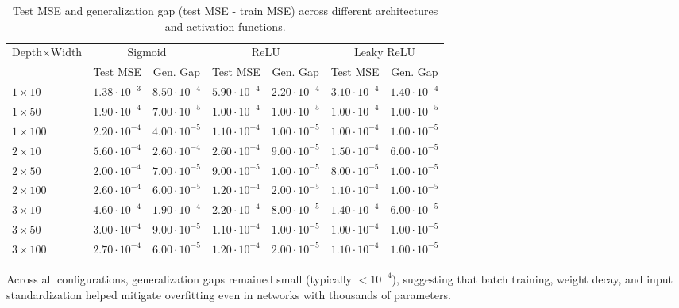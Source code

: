 \documentclass[amssymb,twocolumn,aps]{revtex4}
\begin{document}
\begin{table}[t]
  \caption{Test MSE and generalization gap (test MSE - train MSE) across different architectures and activation functions.}
  \label{tab:mse-gen-gap-combined}
  \centering
  \begin{tabular*}{\textwidth}{@{\extracolsep{\fill}}lcccccc}
    \hline\hline
    Depth$\times$Width & \multicolumn{2}{c}{Sigmoid} & \multicolumn{2}{c}{ReLU} & \multicolumn{2}{c}{Leaky ReLU} \\
    & Test MSE & Gen. Gap & Test MSE & Gen. Gap & Test MSE & Gen. Gap \\
    \hline
    $1\times10$   & $1.38\cdot10^{-3}$ & $8.50\cdot10^{-4}$ & $5.90\cdot10^{-4}$ & $2.20\cdot10^{-4}$ & $3.10\cdot10^{-4}$ & $1.40\cdot10^{-4}$ \\
    $1\times50$   & $1.90\cdot10^{-4}$ & $7.00\cdot10^{-5}$ & $1.00\cdot10^{-4}$ & $1.00\cdot10^{-5}$ & $1.00\cdot10^{-4}$ & $1.00\cdot10^{-5}$ \\
    $1\times100$  & $2.20\cdot10^{-4}$ & $4.00\cdot10^{-5}$ & $1.10\cdot10^{-4}$ & $1.00\cdot10^{-5}$ & $1.00\cdot10^{-4}$ & $1.00\cdot10^{-5}$ \\
    $2\times10$   & $5.60\cdot10^{-4}$ & $2.60\cdot10^{-4}$ & $2.60\cdot10^{-4}$ & $9.00\cdot10^{-5}$ & $1.50\cdot10^{-4}$ & $6.00\cdot10^{-5}$ \\
    $2\times50$   & $2.00\cdot10^{-4}$ & $7.00\cdot10^{-5}$ & $9.00\cdot10^{-5}$ & $1.00\cdot10^{-5}$ & $8.00\cdot10^{-5}$ & $1.00\cdot10^{-5}$ \\
    $2\times100$  & $2.60\cdot10^{-4}$ & $6.00\cdot10^{-5}$ & $1.20\cdot10^{-4}$ & $2.00\cdot10^{-5}$ & $1.10\cdot10^{-4}$ & $1.00\cdot10^{-5}$ \\
    $3\times10$   & $4.60\cdot10^{-4}$ & $1.90\cdot10^{-4}$ & $2.20\cdot10^{-4}$ & $8.00\cdot10^{-5}$ & $1.40\cdot10^{-4}$ & $6.00\cdot10^{-5}$ \\
    $3\times50$   & $3.00\cdot10^{-4}$ & $9.00\cdot10^{-5}$ & $1.10\cdot10^{-4}$ & $1.00\cdot10^{-5}$ & $1.00\cdot10^{-4}$ & $1.00\cdot10^{-5}$ \\
    $3\times100$  & $2.70\cdot10^{-4}$ & $6.00\cdot10^{-5}$ & $1.20\cdot10^{-4}$ & $2.00\cdot10^{-5}$ & $1.10\cdot10^{-4}$ & $1.00\cdot10^{-5}$ \\
    \hline\hline
  \end{tabular*}
\end{table}

Across all configurations, generalization gaps remained small (typically $<10^{-4}$), suggesting that batch training, weight decay, and input standardization helped mitigate overfitting even in networks with thousands of parameters.
\end{document}
